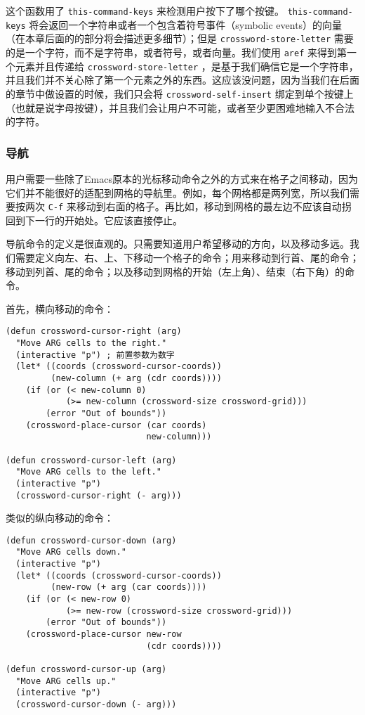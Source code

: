 这个函数用了 \texttt{this-command-keys} 来检测用户按下了哪个按键。 \texttt{this-command-keys} 将会返回一个字符串或者一个包含着符号事件（symbolic events）的向量（在本章后面的的部分将会描述更多细节）；但是 \texttt{crossword-store-letter} 需要的是一个字符，而不是字符串，或者符号，或者向量。我们使用 \texttt{aref} 来得到第一个元素并且传递给 \texttt{crossword-store-letter} ，是基于我们确信它是一个字符串，并且我们并不关心除了第一个元素之外的东西。这应该没问题，因为当我们在后面的章节中做设置的时候，我们只会将 \texttt{crossword-self-insert} 绑定到单个按键上（也就是说字母按键），并且我们会让用户不可能，或者至少更困难地输入不合法的字符。

\subsubsection{导航}
\label{section:10-Navigation}

用户需要一些除了Emacs原本的光标移动命令之外的方式来在格子之间移动，因为它们并不能很好的适配到网格的导航里。例如，每个网格都是两列宽，所以我们需要按两次 \verb|C-f| 来移动到右面的格子。再比如，移动到网格的最左边不应该自动拐回到下一行的开始处。它应该直接停止。

导航命令的定义是很直观的。只需要知道用户希望移动的方向，以及移动多远。我们需要定义向左、右、上、下移动一个格子的命令；用来移动到行首、尾的命令；移动到列首、尾的命令；以及移动到网格的开始（左上角）、结束（右下角）的命令。

首先，横向移动的命令：

\begin{verbatim}
(defun crossword-cursor-right (arg)
  "Move ARG cells to the right."
  (interactive "p") ; 前置参数为数字
  (let* ((coords (crossword-cursor-coords))
         (new-column (+ arg (cdr coords))))
    (if (or (< new-column 0)
            (>= new-column (crossword-size crossword-grid)))
        (error "Out of bounds"))
    (crossword-place-cursor (car coords)
                            new-column)))

(defun crossword-cursor-left (arg)
  "Move ARG cells to the left."
  (interactive "p")
  (crossword-cursor-right (- arg)))
\end{verbatim}

类似的纵向移动的命令：

\begin{verbatim}
(defun crossword-cursor-down (arg)
  "Move ARG cells down."
  (interactive "p")
  (let* ((coords (crossword-cursor-coords))
         (new-row (+ arg (car coords))))
    (if (or (< new-row 0)
            (>= new-row (crossword-size crossword-grid)))
        (error "Out of bounds"))
    (crossword-place-cursor new-row
                            (cdr coords))))

(defun crossword-cursor-up (arg)
  "Move ARG cells up."
  (interactive "p")
  (crossword-cursor-down (- arg)))
\end{verbatim}

